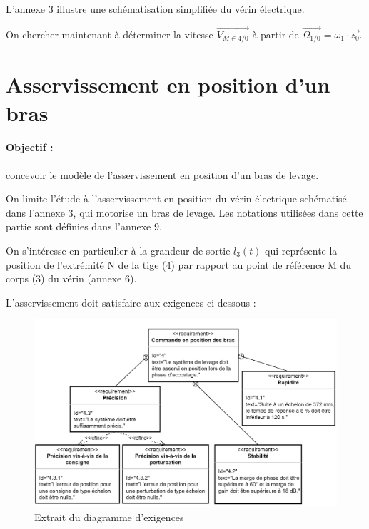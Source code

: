 \newpage

L'annexe 3 illustre une schématisation simplifiée du vérin électrique.


On chercher maintenant à déterminer la vitesse $\overrightarrow{V_{M\in 4/0}}$ à partir de $\overrightarrow{\Omega_{1/0}}=\omega_1\cdot \vec{z_0}$.




\section{Asservissement en position d'un bras}

\paragraph{Objectif :} concevoir le modèle de l'asservissement en position d'un bras de levage.

On limite l'étude à l'asservissement en position du vérin électrique schématisé dans l'annexe 3, qui motorise un bras de levage. Les notations utilisées dans cette partie sont définies dans l'annexe 9.

On s'intéresse en particulier à la grandeur de sortie $l_3(t)$ qui représente la position de l'extrémité N de la tige (4) par rapport au point de référence M du corps (3) du vérin (annexe 6).

L'asservissement doit satisfaire aux exigences ci-dessous :

\begin{figure}[ht!]
\begin{center}
 \includegraphics[width=0.9\linewidth]{img/fig18}
\end{center}
\caption{\label{fig18} Extrait du diagramme d'exigences}
\end{figure}

